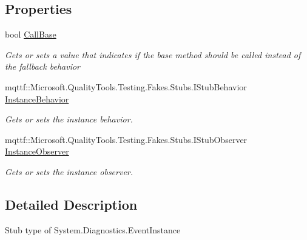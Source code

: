 \subsection*{Properties}
\begin{DoxyCompactItemize}
\item 
bool \hyperlink{class_system_1_1_diagnostics_1_1_fakes_1_1_stub_event_instance_aef0eb96766eec3f159ea5dfae9a6e379}{Call\-Base}
\begin{DoxyCompactList}\small\item\em Gets or sets a value that indicates if the base method should be called instead of the fallback behavior\end{DoxyCompactList}\item 
mqttf\-::\-Microsoft.\-Quality\-Tools.\-Testing.\-Fakes.\-Stubs.\-I\-Stub\-Behavior \hyperlink{class_system_1_1_diagnostics_1_1_fakes_1_1_stub_event_instance_aa8117d6986794b801164d42a494409bd}{Instance\-Behavior}
\begin{DoxyCompactList}\small\item\em Gets or sets the instance behavior.\end{DoxyCompactList}\item 
mqttf\-::\-Microsoft.\-Quality\-Tools.\-Testing.\-Fakes.\-Stubs.\-I\-Stub\-Observer \hyperlink{class_system_1_1_diagnostics_1_1_fakes_1_1_stub_event_instance_acb122c3c36b428eb1cb7cf7790271734}{Instance\-Observer}
\begin{DoxyCompactList}\small\item\em Gets or sets the instance observer.\end{DoxyCompactList}\end{DoxyCompactItemize}


\subsection{Detailed Description}
Stub type of System.\-Diagnostics.\-Event\-Instance



